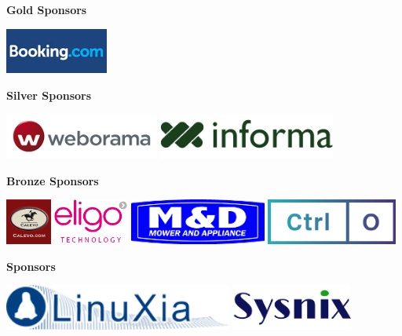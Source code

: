 \begin{center}
\vfill

\textbf{\Large \textsf{Gold Sponsors}}

\vfill

\includegraphics[height=1.5cm]{img/booking-logo.jpg}
\vfill

\textbf{\Large \textsf{Silver Sponsors}}

\vfill

\includegraphics[height=1.5cm]{img/logo-weborama1.png}
\includegraphics[height=1.5cm]{img/informa-logo.png}
\vfill

\textbf{\Large \textsf{Bronze Sponsors}}

\vfill

\includegraphics[height=1.5cm]{img/calevo-logo.jpg}
\includegraphics[height=1.5cm]{img/eligo-logo.jpg}
\includegraphics[height=1.5cm]{img/mandd-logo.png}
\includegraphics[height=1.5cm]{img/CtrlO-logo.png}
\vfill

\textbf{\Large \textsf{Sponsors}}

\vfill

\includegraphics[height=1.5cm]{img/linuxia-logo.png}
\includegraphics[height=1.5cm]{img/sysnix-logo-small.png}
\vfill
\end{center}